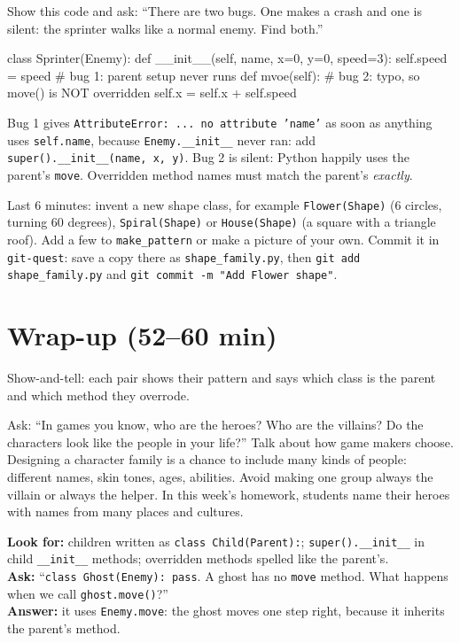 \begin{bughunt}
Show this code and ask: \enquote{There are two bugs. One makes a crash and one is silent: the sprinter walks like a normal enemy. Find both.}
\begin{pycode}
class Sprinter(Enemy):
    def __init__(self, name, x=0, y=0, speed=3):
        self.speed = speed            # bug 1: parent setup never runs
    def mvoe(self):                   # bug 2: typo, so move() is NOT overridden
        self.x = self.x + self.speed
\end{pycode}
Bug 1 gives \texttt{AttributeError: ... no attribute 'name'} as soon as anything uses \texttt{self.name}, because \texttt{Enemy.\_\_init\_\_} never ran: add \texttt{super().\_\_init\_\_(name, x, y)}. Bug 2 is silent: Python happily uses the parent's \texttt{move}. Overridden method names must match the parent's \emph{exactly}.
\end{bughunt}

\begin{freebuild}
Last 6 minutes: invent a new shape class, for example \texttt{Flower(Shape)} (6 circles, turning 60 degrees), \texttt{Spiral(Shape)} or \texttt{House(Shape)} (a square with a triangle roof). Add a few to \texttt{make\_pattern} or make a picture of your own. Commit it in \texttt{git-quest}: save a copy there as \texttt{shape\_family.py}, then \texttt{git add shape\_family.py} and \texttt{git commit -m "Add Flower shape"}.
\end{freebuild}

\section{Wrap-up (52--60 min)}
Show-and-tell: each pair shows their pattern and says which class is the parent and which method they overrode.

\begin{safety}
Ask: \enquote{In games you know, who are the heroes? Who are the villains? Do the characters look like the people in your life?} Talk about how game makers choose. Designing a character family is a chance to include many kinds of people: different names, skin tones, ages, abilities. Avoid making one group always the villain or always the helper. In this week's homework, students name their heroes with names from many places and cultures.
\end{safety}

\begin{formativecheck}
\textbf{Look for:} children written as \texttt{class Child(Parent):}; \texttt{super().\_\_init\_\_} in child \texttt{\_\_init\_\_} methods; overridden methods spelled like the parent's.\\
\textbf{Ask:} \enquote{\texttt{class Ghost(Enemy): pass}. A ghost has no \texttt{move} method. What happens when we call \texttt{ghost.move()}?}\\
\textbf{Answer:} it uses \texttt{Enemy.move}: the ghost moves one step right, because it inherits the parent's method.
\end{formativecheck}


